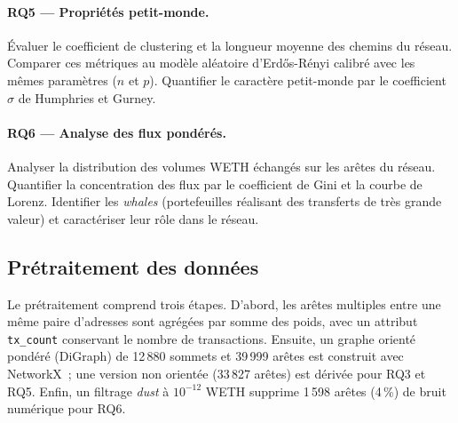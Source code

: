 \paragraph{RQ5 --- Propri\'et\'es petit-monde.}
\'Evaluer le coefficient de clustering et la longueur moyenne des chemins du
r\'eseau. Comparer ces m\'etriques au mod\`ele al\'eatoire d'Erd\H{o}s-R\'enyi
calibr\'e avec les m\^emes param\`etres ($n$ et $p$). Quantifier le caract\`ere
petit-monde par le coefficient $\sigma$ de Humphries et Gurney.

\paragraph{RQ6 --- Analyse des flux pond\'er\'es.}
Analyser la distribution des volumes WETH \'echang\'es sur les ar\^etes du
r\'eseau. Quantifier la concentration des flux par le coefficient de Gini et la
courbe de Lorenz. Identifier les \textit{whales} (portefeuilles r\'ealisant des
transferts de tr\`es grande valeur) et caract\'eriser leur r\^ole dans le r\'eseau.

\subsection{Pr\'etraitement des donn\'ees}
\label{sec:description_preprocessing}

Le pr\'etraitement comprend trois \'etapes. D'abord, les ar\^etes multiples
entre une m\^eme paire d'adresses sont agr\'eg\'ees par somme des poids, avec
un attribut \texttt{tx\_count} conservant le nombre de transactions. Ensuite,
un graphe orient\'e pond\'er\'e (DiGraph) de 12\,880 sommets et 39\,999 ar\^etes
est construit avec NetworkX~; une version non orient\'ee (33\,827 ar\^etes) est
d\'eriv\'ee pour RQ3 et RQ5. Enfin, un filtrage \textit{dust} \`a $10^{-12}$
WETH supprime 1\,598 ar\^etes (4\,\%) de bruit num\'erique pour RQ6.
